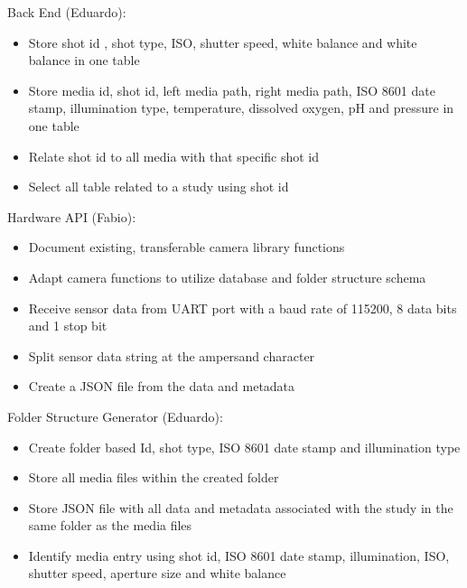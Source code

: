 Back End (Eduardo):
\begin{itemize}
	\item Store shot id , shot type, ISO, shutter speed, white balance and white balance in one table
	\item Store media id, shot id, left media path, right media path, ISO 8601 date stamp, illumination type, temperature, dissolved oxygen, pH and pressure in one table
	\item Relate shot id to all media with that specific shot id
	\item Select all table related to a study using shot id
\end{itemize}
Hardware API (Fabio):
\begin{itemize}
	\item Document existing, transferable camera library functions
	\item Adapt camera functions to utilize database and folder structure schema
	\item Receive sensor data from UART port with a baud rate of 115200, 8 data bits and 1 stop bit
	\item Split sensor data string at the ampersand character
	\item Create a JSON file from the data and metadata
\end{itemize}
Folder Structure Generator (Eduardo):
\begin{itemize}
	\item Create folder based Id, shot type, ISO 8601 date stamp and illumination type
	\item Store all media files within the created folder
	\item Store JSON file with all data and metadata associated with the study in the same folder as the media files
	\item Identify media entry using shot id, ISO 8601 date stamp, illumination, ISO, shutter speed, aperture size and white balance
\end{itemize}
